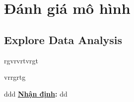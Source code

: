 \chapter{Đánh giá mô hình}

\section{Explore Data Analysis}

rgvrvrtvrgt \par
vrrgrtg \par

ddd \textbf{\underline{Nhận định}:} dd